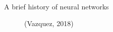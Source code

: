 \begin{vbframe}{A brief history of neural networks}
\begin{figure}
\centering
{}
\vspace{.5cm}
\caption{(Vazquez, 2018)}
\framebreak

\end{figure}
\framebreak



\end{vbframe}
